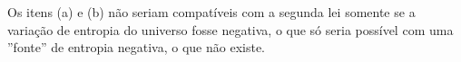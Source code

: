 \documentclass[12pt,a4paper,brazilian, fleqn]{article}
\begin{document}
\begin{enumerate}
\begin{enumerate}
                Os itens (a) e (b) não seriam compatíveis com a segunda lei
                somente se a variação de entropia do universo fosse negativa, o
                que só seria possível com uma ''fonte'' de entropia negativa, o
                que não existe.
        \end{enumerate}
       
\end{enumerate}
\end{document}
